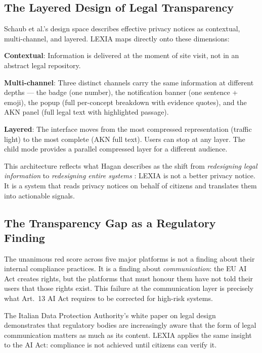\documentclass[12pt, a4paper]{article}
\begin{document}
\subsection{The Layered Design of Legal Transparency}

Schaub et al.'s design space \cite{schaub2015} describes effective privacy notices as contextual, multi-channel, and layered. LEXIA maps directly onto these dimensions:

\textbf{Contextual}: Information is delivered at the moment of site visit, not in an abstract legal repository.

\textbf{Multi-channel}: Three distinct channels carry the same information at different depths --- the badge (one number), the notification banner (one sentence + emoji), the popup (full per-concept breakdown with evidence quotes), and the AKN panel (full legal text with highlighted passage).

\textbf{Layered}: The interface moves from the most compressed representation (traffic light) to the most complete (AKN full text). Users can stop at any layer. The child mode provides a parallel compressed layer for a different audience.

This architecture reflects what Hagan describes as the shift from \emph{redesigning legal information} to \emph{redesigning entire systems} \cite{hagan2017}: LEXIA is not a better privacy notice. It is a system that reads privacy notices on behalf of citizens and translates them into actionable signals.

\subsection{The Transparency Gap as a Regulatory Finding}

The unanimous red score across five major platforms is not a finding about their internal compliance practices. It is a finding about \emph{communication}: the EU AI Act creates rights, but the platforms that must honour them have not told their users that those rights exist. This failure at the communication layer is precisely what Art.\ 13 AI Act requires to be corrected for high-risk systems.

The Italian Data Protection Authority's white paper on legal design \cite{garante2025} demonstrates that regulatory bodies are increasingly aware that the form of legal communication matters as much as its content. LEXIA applies the same insight to the AI Act: compliance is not achieved until citizens can verify it.
\end{document}
